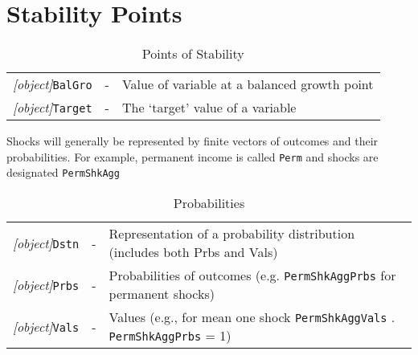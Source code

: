 \documentclass[12pt]{\econtex}
\begin{document}
\hypertarget{Stability-Points}{}
\section{Stability Points}
\begin{table}[ht]
\centering
  \begin{tabular}{|>{\ttfamily}lcl|} \hline 
     \textit{[object]}\texttt{BalGro} & - & Value of variable at a balanced growth point
    \\ \textit{[object]}\texttt{Target} & - & The `target' value of a variable \\ \hline
  \end{tabular}
  \caption{Points of Stability}
  \label{table:Stability}
\end{table}	


\medskip\medskip
\hypertarget{Shocks}{}
Shocks will generally be represented by finite vectors of outcomes and their probabilities.  For example, permanent income is called \texttt{Perm} and shocks are designated \texttt{PermShkAgg}
\begin{table}[ht]
  \centering
  \begin{tabular}{|>{\ttfamily}ccl|} 		
    \hline
    \textit{[object]}\texttt{Dstn} & - & Representation of a probability distribution (includes both Prbs and Vals)
    \\ \textit{[object]}\texttt{Prbs} & - & Probabilities of outcomes (e.g. \texttt{PermShkAggPrbs} for permanent shocks) 
    \\ \textit{[object]}\texttt{Vals} & - & Values (e.g., for mean one shock \texttt{PermShkAggVals} . \texttt{PermShkAggPrbs} = 1)                                            
    \\ 	\hline
  \end{tabular}
  \caption{Probabilities}
  \label{table:Probabilities}
\end{table}	
\end{document}

